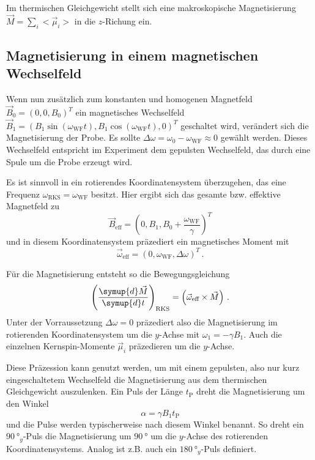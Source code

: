 Im thermischen Gleichgewicht stellt sich eine makroskopische Magnetisierung $\vec{M} = \sum_i <\vec{\mu}_i>$ in die $z$-Richung ein.

\subsection{Magnetisierung in einem magnetischen Wechselfeld}
\label{ssec:Magnetisierung_wechsel}

Wenn nun zusätzlich zum konstanten und homogenen Magnetfeld $\vec{B}_0 = (0,0,B_0)^T$ ein magnetisches Wechselfeld
$\vec{B}_1 = (B_1 \sin(\omega_\text{WF} t),B_1 \cos(\omega_\text{WF} t),0)^T$ geschaltet wird, verändert sich die Magnetisierung der Probe.
Es sollte $\Delta \omega = \omega_0 - \omega_\text{WF} \approx 0$ gewählt werden.
Dieses Wechselfeld entspricht im Experiment dem gepulsten Wechselfeld, das durch eine Spule um die Probe erzeugt wird.

Es ist sinnvoll in ein rotierendes Koordinatensystem überzugehen, das eine Frequenz $\omega_\text{RKS} = \omega_\text{WF}$ besitzt.
Hier ergibt sich das gesamte bzw. effektive Magnetfeld zu
\begin{equation}
    \vec{B}_\text{eff} = (0, B_1, B_0 + \frac{\omega_\text{WF}}{\gamma})^T
\end{equation}
und in diesem Koordinatensystem präzediert ein magnetisches Moment mit 
\begin{equation}
    \vec{\omega}_\text{eff} = (0, \omega_\text{WF}, \Delta \omega)^T \, .
\end{equation}

Für die Magnetisierung entsteht so die Bewegungsgleichung 
\begin{equation}
    \left( \frac{\symup{d} \vec{M}}{\symup{d} t} \right)_\text{RKS} = \left( \vec{\omega}_\text{eff} \times \vec{M} \right) \, .
    \label{eq:M_beweg}
\end{equation}
Unter der Vorraussetzung $\Delta \omega = 0$ präzediert also die Magnetisierung im rotierenden Koordinatensystem um die $y$-Achse mit $\omega_1 = - \gamma B_1$.
Auch die einzelnen Kernspin-Momente $\vec{\mu}_i$ präzedieren um die $y$-Achse.

Diese Präzession kann genutzt werden, um mit einem gepulsten, also nur kurz eingeschaltetem Wechselfeld die Magnetisierung aus dem thermischen Gleichgewicht auszulenken.
Ein Puls der Länge $t_\text{P}$ dreht die Magnetisierung um den Winkel
\begin{equation}
    \alpha = \gamma B_1 t_\text{P}
\end{equation}
und die Pulse werden typischerweise nach diesem Winkel benannt.
So dreht ein $\SI{90}{\degree}_y$-Puls die Magnetisierung um $\SI{90}{\degree}$ um die $y$-Achse des rotierenden Koordinatensystems. 
Analog ist z.B. auch ein $\SI{180}{\degree}_y$-Puls definiert.

